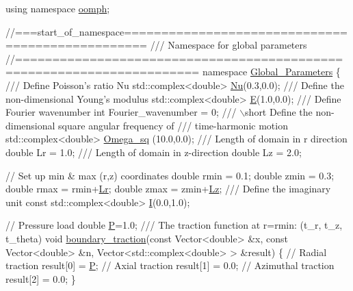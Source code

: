 \begin{DoxyCodeInclude}
\textcolor{keyword}{using namespace }\hyperlink{namespaceoomph}{oomph};


\textcolor{comment}{//===start\_of\_namespace=================================================}\textcolor{comment}{}
\textcolor{comment}{/// Namespace for global parameters}
\textcolor{comment}{}\textcolor{comment}{//======================================================================}
\textcolor{keyword}{namespace }\hyperlink{namespaceGlobal__Parameters}{Global\_Parameters}
\{\textcolor{comment}{}
\textcolor{comment}{ /// Define Poisson's ratio Nu}
\textcolor{comment}{} std::complex<double> \hyperlink{namespaceGlobal__Parameters_a5978c2a1498ec7775b228a11a3912209}{Nu}(0.3,0.0);
\textcolor{comment}{}
\textcolor{comment}{ /// Define the non-dimensional Young's modulus}
\textcolor{comment}{} std::complex<double> \hyperlink{namespaceGlobal__Parameters_ac74d762d76b56416281173421b018460}{E}(1.0,0.0);
\textcolor{comment}{}
\textcolor{comment}{ /// Define Fourier wavenumber}
\textcolor{comment}{} \textcolor{keywordtype}{int} Fourier\_wavenumber = 0;
\textcolor{comment}{}
\textcolor{comment}{ /// \(\backslash\)short Define the non-dimensional square angular frequency of }
\textcolor{comment}{ /// time-harmonic motion}
\textcolor{comment}{} std::complex<double> \hyperlink{namespaceGlobal__Parameters_aa7f960ed4311ccf6e3dbf9371f13876a}{Omega\_sq} (10.0,0.0);
\textcolor{comment}{}
\textcolor{comment}{ /// Length of domain in r direction}
\textcolor{comment}{} \textcolor{keywordtype}{double} Lr = 1.0;
\textcolor{comment}{}
\textcolor{comment}{ /// Length of domain in z-direction}
\textcolor{comment}{} \textcolor{keywordtype}{double} Lz = 2.0;

 \textcolor{comment}{// Set up min & max (r,z) coordinates}
 \textcolor{keywordtype}{double} rmin = 0.1;
 \textcolor{keywordtype}{double} zmin = 0.3;
 \textcolor{keywordtype}{double} rmax = rmin+\hyperlink{namespaceGlobal__Parameters_a444f5c911c8805ad2ba45ed8b1b8904e}{Lr};
 \textcolor{keywordtype}{double} zmax = zmin+\hyperlink{namespaceGlobal__Parameters_a2bcf0bd846d839f1e3bb04a6c0a612c1}{Lz};
 \textcolor{comment}{}
\textcolor{comment}{ /// Define the imaginary unit}
\textcolor{comment}{} \textcolor{keyword}{const} std::complex<double> \hyperlink{namespaceGlobal__Parameters_a2ceef30cf51dfd432bafde39945a4e45}{I}(0.0,1.0);

 \textcolor{comment}{// Pressure load}
 \textcolor{keywordtype}{double} \hyperlink{namespaceGlobal__Parameters_a31fb55c20db4aa0127aafa20f0d76731}{P}=1.0;
\textcolor{comment}{}
\textcolor{comment}{ /// The traction function at r=rmin: (t\_r, t\_z, t\_theta)}
\textcolor{comment}{} \textcolor{keywordtype}{void} \hyperlink{namespaceGlobal__Parameters_a579fa434bf9ee57e66d4bd42b208fc23}{boundary\_traction}(\textcolor{keyword}{const} Vector<double> &x,
                      \textcolor{keyword}{const} Vector<double> &n,
                      Vector<std::complex<double> > &result)
 \{
  \textcolor{comment}{// Radial traction}
  result[0] = \hyperlink{namespaceGlobal__Parameters_a31fb55c20db4aa0127aafa20f0d76731}{P};
  \textcolor{comment}{// Axial traction}
  result[1] = 0.0;
  \textcolor{comment}{// Azimuthal traction}
  result[2] = 0.0;
 \}
 

\end{DoxyCodeInclude}
